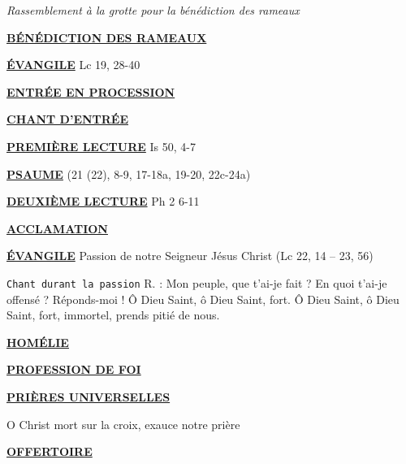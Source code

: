 \documentclass[11pt,a4paper]{article}
\newcommand{\SepRule}{\noindent							 %
						\begin{center}
							\rule{250pt}{1pt}
						\end{center}
						}
\newcommand{\NewsItem}[1]{%
\vspace{3pt}
\underline{\textbf{#1}}
		  }
\begin{document}





\textit{Rassemblement à la grotte pour la bénédiction des rameaux}

\NewsItem{BÉNÉDICTION DES RAMEAUX}

	

\NewsItem{ÉVANGILE} Lc 19, 28-40

\NewsItem{ENTRÉE EN PROCESSION}

\NewsItem{CHANT D'ENTRÉE}
	


\NewsItem{PREMIÈRE LECTURE} Is 50, 4-7

\NewsItem{PSAUME} (21 (22), 8-9, 17-18a, 19-20, 22c-24a)


\NewsItem{DEUXIÈME LECTURE} Ph 2 6-11

\NewsItem{ACCLAMATION}
	

\NewsItem{ÉVANGILE} Passion de notre Seigneur Jésus Christ (Lc 22, 14 – 23, 56)

\texttt{Chant durant la passion}  R. : Mon peuple, que t'ai-je fait ? En quoi
t'ai-je offensé ? Réponds-moi ! Ô Dieu Saint, ô Dieu Saint, fort.
Ô Dieu Saint, ô Dieu Saint, fort, immortel, prends pitié de nous.


\NewsItem{HOMÉLIE}

\NewsItem{PROFESSION DE FOI} 


\NewsItem{PRIÈRES UNIVERSELLES} 
O Christ mort sur la croix, exauce notre prière

\NewsItem{OFFERTOIRE} 
\end{document}
